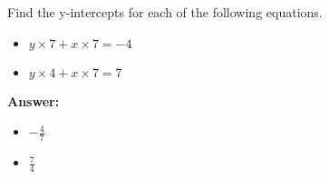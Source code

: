  Find the y-intercepts for each of the following equations. \begin{itemize}\item \( y \times 7 + x \times 7 = -4 \)\item \( y \times 4 + x \times 7 = 7 \)\end{itemize}

        \textbf{Answer:} \begin{itemize}\item \( -\frac{4}{7} \)\item \( \frac{7}{4} \)\end{itemize}
